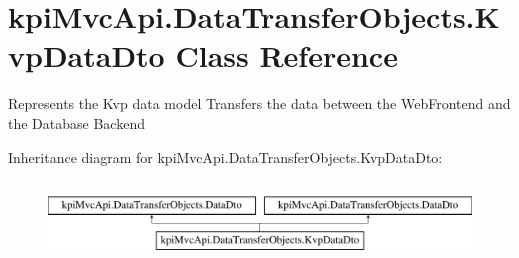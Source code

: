 \hypertarget{classkpi_mvc_api_1_1_data_transfer_objects_1_1_kvp_data_dto}{}\section{kpi\+Mvc\+Api.\+Data\+Transfer\+Objects.\+Kvp\+Data\+Dto Class Reference}
\label{classkpi_mvc_api_1_1_data_transfer_objects_1_1_kvp_data_dto}


Represents the Kvp data model Transfers the data between the Web\+Frontend and the Database Backend  


Inheritance diagram for kpi\+Mvc\+Api.\+Data\+Transfer\+Objects.\+Kvp\+Data\+Dto\+:\begin{figure}[H]
\begin{center}
\leavevmode
\includegraphics[height=2.000000cm]{classkpi_mvc_api_1_1_data_transfer_objects_1_1_kvp_data_dto}
\end{center}
\end{figure}
